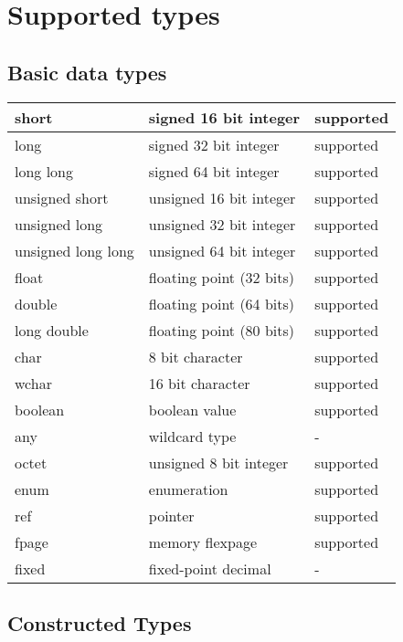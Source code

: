 \section{Supported types}

\subsection*{Basic data types}

\begin{center}\begin{tabular}{|l|l|l|}
\hline
short 		& signed 16 bit integer 	& supported \\\hline
long 		& signed 32 bit integer 	& supported \\\hline
long long	& signed 64 bit integer		& supported \\\hline
unsigned short 	& unsigned 16 bit integer	& supported \\\hline
unsigned long	& unsigned 32 bit integer	& supported \\\hline
unsigned long long & unsigned 64 bit integer	& supported \\\hline
float		& floating point (32 bits)	& supported \\\hline
double		& floating point (64 bits)	& supported \\\hline
long double	& floating point (80 bits)	& supported \\\hline
char		& 8 bit character		& supported \\\hline
wchar		& 16 bit character		& supported \\\hline
boolean		& boolean value			& supported \\\hline
any		& wildcard type			& -\\\hline
octet		& unsigned 8 bit integer	& supported \\\hline
enum		& enumeration			& supported \\\hline
ref		& pointer			& supported \\\hline
fpage		& memory flexpage		& supported \\\hline
fixed		& fixed-point decimal		& -\\
\hline
\end{tabular}\end{center}

\subsection*{Constructed Types}

